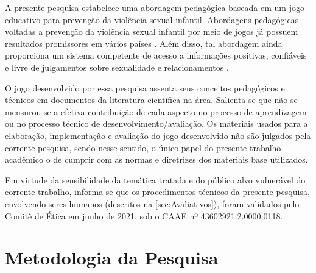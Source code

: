 A presente pesquisa estabelece uma abordagem pedagógica baseada em um jogo educativo para prevenção da violência sexual infantil. Abordagens pedagógicas voltadas a prevenção da violência sexual infantil por meio de jogos já possuem resultados promissores em vários países \cite{muller2014child, fingerle2018abschlussbericht}. Além disso, tal abordagem ainda proporciona um sistema competente de acesso a informações positivas, confiáveis e livre de julgamentos sobre sexualidade e relacionamentos \cite{unesco2018international}. %

O jogo desenvolvido por essa pesquisa assenta seus conceitos pedagógicos e técnicos em documentos da literatura científica na área. Salienta-se que não se mensurou-se a efetiva contribuição de cada aspecto no processo de aprendizagem ou no processo técnico de desenvolvimento/avaliação. Os materiais usados para a elaboração, implementação e avaliação do jogo desenvolvido não são julgados pela corrente pesquisa, sendo nesse sentido, o único papel do presente trabalho acadêmico o de cumprir com as normas e diretrizes dos materiais base utilizados. 


Em virtude da sensibilidade da temática tratada e do público alvo vulnerável do corrente trabalho, informa-se que os procedimentos técnicos da presente pesquisa, envolvendo seres humanos (descritos na \autoref{sec:Avaliativos}), foram validados pelo Comitê de Ética em junho de 2021, sob o \ac{CAAE} nº 43602921.2.0000.0118. %

\newpage
\section{Metodologia da Pesquisa}\label{sec:Metodologia}

